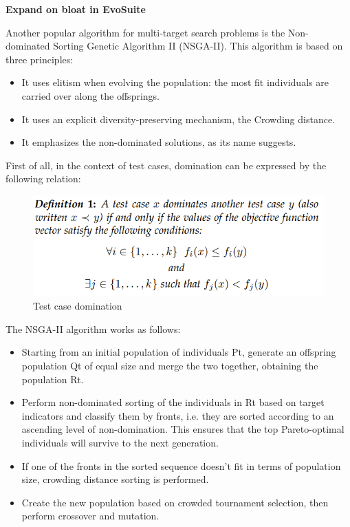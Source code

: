 \textbf{Expand on bloat in EvoSuite}


Another popular algorithm for multi-target search problems is the Non-dominated Sorting Genetic Algorithm II (NSGA-II). This algorithm is based on three principles:

\begin{itemize}
    \item It uses elitism when evolving the population: the most fit individuals are carried over along the offsprings.
    \item It uses an explicit diversity-preserving mechanism, the Crowding distance.
    \item It emphasizes the non-dominated solutions, as its name suggests.
\end{itemize}

First of all, in the context of test cases, domination can be expressed by the following relation:
\begin{figure}[!h]
    \centering
    \includegraphics[scale=0.4]{./figures/test_Case_domination.PNG}
    \caption{Test case domination}
    \label{fig:test case domination}
\end{figure}


The NSGA-II algorithm works as follows:
\begin{itemize}
    \item Starting from an initial population of individuals Pt, generate an offspring population Qt of equal size and merge the two together, obtaining the population Rt.
    \item Perform non-dominated sorting of the individuals in Rt based on target indicators and classify them by fronts, i.e. they are sorted according to an ascending level of non-domination.  This ensures that the top Pareto-optimal individuals will survive to the next generation.
    \item If one of the fronts in the sorted sequence doesn't fit in terms of population size, crowding distance sorting is performed.
    \item Create the new population based on crowded tournament selection, then perform crossover and mutation. 
\end{itemize}


